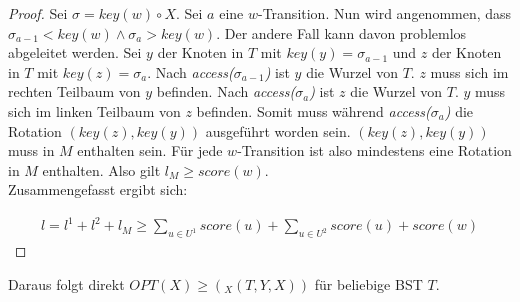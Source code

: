 \documentclass[a4paper,12pt]{article}
\begin{document}
\begin{proof}
	Sei $\sigma = \mathit{key}(w) \circ X$. Sei $a$ eine $w$-Transition. Nun wird angenommen, dass $\sigma_{a-1} < \mathit{key}(w)  \land \sigma_{a} > \mathit{key}(w)$. Der andere Fall kann davon problemlos abgeleitet werden. Sei $y$ der Knoten in $T$ mit $\mathit{key}(y) = \sigma_{a-1}$ und $z$ der Knoten in $T$ mit $\mathit{key}(z) = \sigma_{a}$. Nach \textit{access($\sigma_{a-1}$)} ist $y$ die Wurzel von $T$. $z$ muss sich im rechten Teilbaum von $y$ befinden. Nach  \textit{access($\sigma_{a}$)} ist $z$ die Wurzel von $T$. $y$ muss sich im linken Teilbaum von $z$ befinden. Somit muss während \textit{access($\sigma_{a}$)} die Rotation $(\mathit{key}(z),\mathit{key}(y))$ ausgeführt worden sein. $(\mathit{key}(z),\mathit{key}(y))$ muss in $M$ enthalten sein. Für jede $w$-Transition ist also mindestens eine Rotation in $M$ enthalten. Also gilt $l_M \geq  \mathit{score} \left(w\right)$.\\
	Zusammengefasst ergibt sich:
	
	\begin{align*}
	l = l^1 + l^2 + l_M \geq \sum_{u \in U^1} {\mathit{score}} (u) + \sum_{u \in U^2}{\mathit{score}} (u) +  {\mathit{score}} (w)
	\end{align*}
	
	
	
	
\end{proof}

\noindent Daraus folgt direkt  $\mathit{OPT}\left(X\right) \geq \left({_X(T, Y, X)}\right) $ für beliebige BST $T$.  
\end{document}
